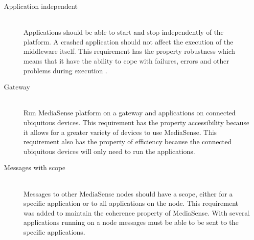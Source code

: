 \begin{description}
	\item[Application independent] \hfill \\
	Applications should be able to start and stop independently of the platform. A crashed application should not affect the execution of the middleware itself. This requirement has the property robustness which means that it have the ability to cope with failures, errors and other problems during execution \cite{johannesson2012design}.
	
	\item[Gateway] \hfill \\
	Run MediaSense platform on a gateway and applications on connected ubiquitous devices.
This requirement has the property accessibility because it allows for a greater variety of devices to use MediaSense. This requirement also has the property of efficiency because the connected ubiquitous devices will only need to run the applications.
	
	\item[Messages with scope] \hfill \\
	Messages to other MediaSense nodes should have a scope, either for a specific application or to all applications on the node. This requirement was added to maintain the coherence property of MediaSense. With several applications running on a node messages must be able to be sent to the specific applications.

	
\end{description}	

